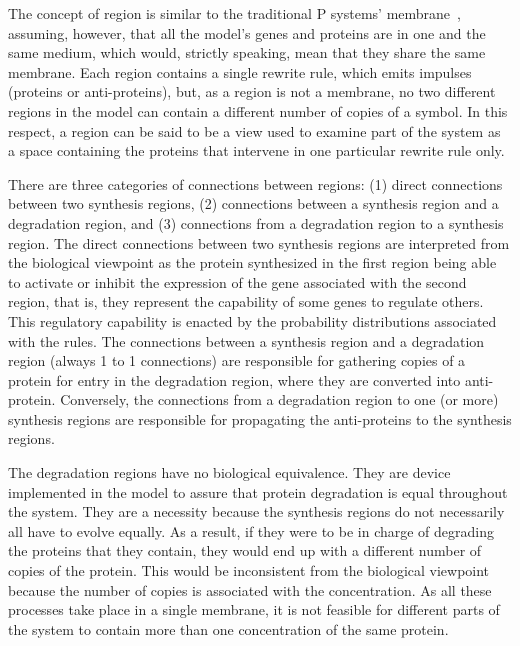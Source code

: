 \documentclass[runningheads,a4paper]{llncs}
\begin{document}
The concept of region is similar to the traditional P systems' membrane~\cite{Paun2000}, assuming, however, that all the model's genes and proteins are in one and the same medium, which would, strictly speaking, mean that they share the same membrane. Each region contains a single rewrite rule, which emits impulses (proteins or anti-proteins), but, as a region is not a membrane, no two different regions in the model can contain a different number of copies of a symbol. In this respect, a region can be said to be a view used to examine part of the system as a space containing the proteins that intervene in one particular rewrite rule only.

There are three categories of connections between regions: (1) direct connections between two synthesis regions, (2) connections between a synthesis region and a degradation region, and (3) connections from a degradation region to a synthesis region. The direct connections between two synthesis regions are interpreted from the biological viewpoint as the protein synthesized in the first region being able to activate or inhibit the expression of the gene associated with the second region, that is, they represent the capability of some genes to regulate others. This regulatory capability is enacted by the probability distributions associated with the rules. The connections between a synthesis region and a degradation region (always 1 to 1 connections) are responsible for gathering copies of a protein for entry in the degradation region, where they are converted into anti-protein. Conversely, the connections from a degradation region to one (or more) synthesis regions are responsible for propagating the anti-proteins to the synthesis regions.

The degradation regions have no biological equivalence. They are device implemented in the model to assure that protein degradation is equal throughout the system. They are a necessity because the synthesis regions do not necessarily all have to evolve equally. As a result, if they were to be in charge of degrading the proteins that they contain, they would end up with a different number of copies of the protein. This would be inconsistent from the biological viewpoint because the number of copies is associated with the concentration. As all these processes take place in a single membrane, it is not feasible for different parts of the system to contain more than one concentration of the same protein.
\end{document}
